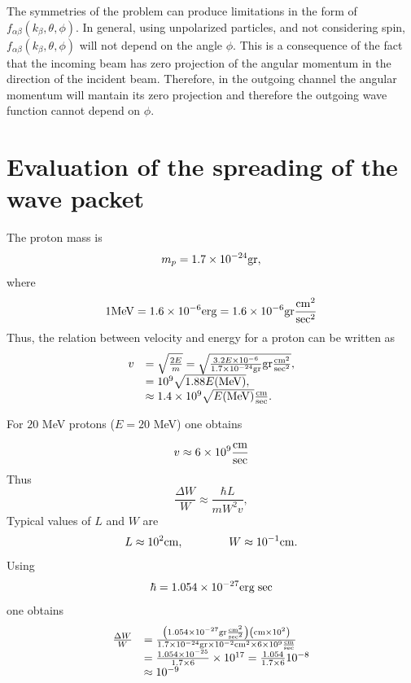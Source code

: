 The symmetries of the problem can produce limitations in the form of $f_{\alpha \beta}(k_{\beta},\theta,\phi)$. In general, using unpolarized particles, and not considering spin, $f_{\alpha \beta}(k_{\beta},\theta,\phi)$ will not depend on the angle $\phi$. This is a consequence of the fact that the incoming beam has zero projection of the angular momentum in the direction of the incident beam. Therefore, in the outgoing channel the angular momentum will mantain its zero projection and therefore the outgoing wave function cannot depend on $\phi$.



\section{Evaluation of the spreading of the wave packet}
The proton mass is
\begin{equation}
m_p = 1.7 \times 10^{-24} {\rm gr},
\end{equation}
where
\begin{equation}
1 {\rm MeV} = 1.6 \times 10^{-6} {\rm erg} = 1.6 \times 10^{-6} {\rm gr} \frac{{\rm cm}^2}{{\rm sec}^2}
\end{equation}
Thus, the relation between velocity and energy for a proton can be written as
\begin{equation}
\begin{array}{rl}
v &= \sqrt{\frac{2E}{m}} = \sqrt{\frac{3.2 E \times 10^{-6}}{1.7 \times 10^{-24} {\rm gr}}{\rm gr} \frac{{\rm cm}^2}{{\rm sec}^2}}, \\
  &= 10^9 \sqrt{1.88 E ({\rm MeV})}, \\
	&\approx 1.4 \times 10^9 \sqrt{E({\rm MeV})} \frac{{\rm cm}}{{\rm sec}}.
\end{array}
\end{equation}

For $20$ MeV protons ($E = 20$ MeV) one obtains

\begin{equation}
v \approx 6 \times 10^{9} \frac{{\rm cm}}{{\rm sec}}
\end{equation}
Thus
\begin{equation}
\frac{\Delta W}{W} \approx \frac{\hbar L}{m W^2 v},
\end{equation}
Typical values of $L$ and $W$ are
\begin{equation}
L \approx 10^2 {\rm cm}, \qquad \qquad W \approx 10^{-1} {\rm cm}.
\end{equation}
Using
\begin{equation}
\hbar = 1.054 \times 10^{-27} {\rm erg \; sec}
\end{equation}
one obtains
\begin{equation}
\begin{array}{rl}
\frac{\Delta W}{W} &= \frac{\left( 1.054 \times 10^{-27} {\rm gr} \frac{{\rm cm^2}}{{\rm sec^2}} \right) \left( {\rm cm} \times 10^2 \right)}{1.7 \times 10^{-24} {\rm gr} \times 10^{-2} {\rm cm^2} \times 6 \times 10^9 \frac{{\rm cm}}{{\rm sec}}} \\
&= \frac{1.054 \times 10^{-25}}{1.7 \times 6} \times 10^{17} = \frac{1.054}{1.7 \times 6} 10^{-8} \\
&\approx 10^{-9}
\end{array}
\end{equation}
